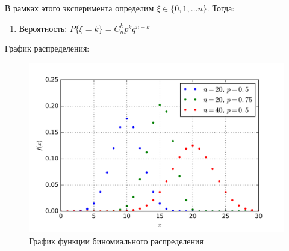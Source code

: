 
\begin{theorem}[О вероятности]
    В рамках этого эксперимента определим
    $\xi \in \{0, 1, \dots n\}$.
    Тогда:
    \begin{enumerate}
        \item Вероятность: $P\{\xi = k\} = C_n^k p^k q^{n - k}$
    \end{enumerate}
\end{theorem}

График распределения:
\begin{figure}[H]
    \centering
    \includegraphics[scale=0.2]{images/binom.png}
    \caption{График функции биномиального распределения}
\end{figure}
